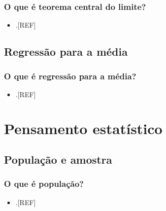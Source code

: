 \documentclass[
  a4paper,
]{book}
\providecommand{\tightlist}{%
  \setlength{\itemsep}{0pt}\setlength{\parskip}{0pt}}
\begin{document}
\hypertarget{o-que-uxe9-teorema-central-do-limite}{%
\subsection{O que é teorema central do limite?}\label{o-que-uxe9-teorema-central-do-limite}}

\begin{itemize}
\tightlist
\item
  .{[}REF{]}
\end{itemize}

\hypertarget{regressao-media}{%
\section{Regressão para a média}\label{regressao-media}}

\hypertarget{o-que-uxe9-regressuxe3o-para-a-muxe9dia}{%
\subsection{O que é regressão para a média?}\label{o-que-uxe9-regressuxe3o-para-a-muxe9dia}}

\begin{itemize}
\tightlist
\item
  .{[}REF{]}
\end{itemize}

\hypertarget{pensamento-estatistico}{%
\chapter{\texorpdfstring{\textbf{Pensamento estatístico}}{Pensamento estatístico}}\label{pensamento-estatistico}}

\hypertarget{populacao-amostra}{%
\section{População e amostra}\label{populacao-amostra}}

\hypertarget{o-que-uxe9-populauxe7uxe3o}{%
\subsection{O que é população?}\label{o-que-uxe9-populauxe7uxe3o}}

\begin{itemize}
\tightlist
\item
  .{[}REF{]}
\end{itemize}
\end{document}
